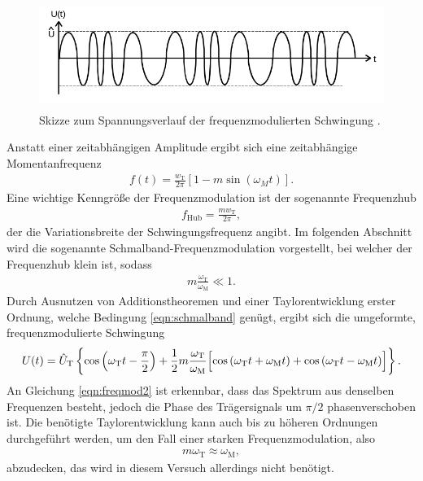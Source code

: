 \begin{figure}
  \centering
  \includegraphics[height=3.5cm]{JasperErsterSchultag/freqmodskizze.png}
  \caption{Skizze zum Spannungsverlauf der frequenzmodulierten Schwingung \cite{anleitung}.}
  \label{fig:freqmodskizze}
\end{figure}

Anstatt einer zeitabhängigen Amplitude ergibt sich eine zeitabhängige Momentanfrequenz
\begin{align}
  f(t) = \frac{w_\text{T}}{2 \pi} \left[1 - m \sin(\omega_M t)\right].
  \label{eqn:momentanfreq}
\end{align}
Eine wichtige Kenngröße der Frequenzmodulation ist der sogenannte Frequenzhub
\begin{align}
  f_\text{Hub} = \frac{m w_\text{T}}{2 \pi},
  \label{eqn:frequenzhub}
\end{align}
der die Variationsbreite der Schwingungsfrequenz angibt.
Im folgenden Abschnitt wird die sogenannte Schmalband-Frequenzmodulation vorgestellt,
bei welcher der Frequenzhub klein ist, sodass
\begin{align}
  m \frac{\omega_\text{T}}{\omega_\text{M}} \ll 1.
  \label{eqn:schmalband}
\end{align}
Durch Ausnutzen von Additionstheoremen und einer Taylorentwicklung erster Ordnung, welche
Bedingung \eqref{eqn:schmalband} genügt, ergibt sich die umgeformte, frequenzmodulierte Schwingung
\begin{align}
  U(t) = \hat{U}_\text{T} \left\{ \cos{\Bigl(\omega_\text{T} t - \frac{\pi}{2}\Bigr)} + \frac12 m \frac{\omega_\text{T}}{\omega_\text{M}} \Bigl[  \cos{(\omega_\text{T}t+\omega_\text{M}t)} + \cos{(\omega_\text{T}t-\omega_\text{M}t)} \Bigr] \right\}.
  \label{eqn:freqmod2}
\end{align}
An Gleichung \eqref{eqn:freqmod2} ist erkennbar, dass das Spektrum aus denselben Frequenzen besteht, jedoch
die Phase des Trägersignals um $\pi/2$ phasenverschoben ist.
Die benötigte Taylorentwicklung kann auch bis zu höheren Ordnungen durchgeführt werden, um den Fall einer starken
Frequenzmodulation, also
\begin{align}
  m \omega_\text{T} \approx \omega_\text{M},
\end{align}
abzudecken, das wird in diesem Versuch allerdings nicht benötigt.

